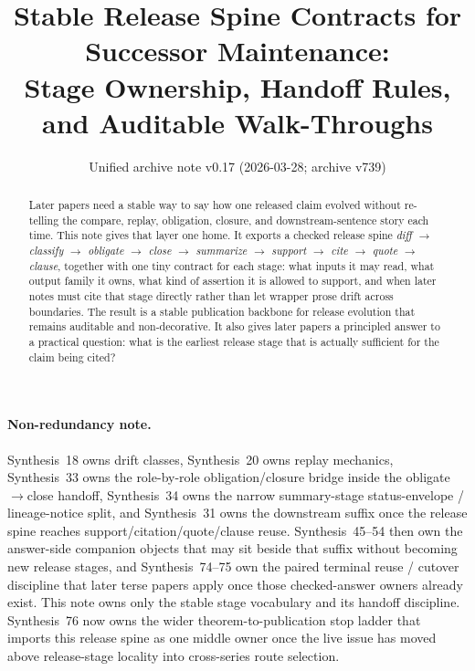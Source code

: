 \documentclass[11pt]{article}
\title{Stable Release Spine Contracts for Successor Maintenance:\\[0.5ex]
\large Stage Ownership, Handoff Rules, and Auditable Walk-Throughs}
\author{}
\date{Unified archive note v0.17 (2026-03-28; archive v739)}
\begin{document}
\maketitle

\begin{abstract}
Later papers need a stable way to say how one released claim evolved without re-telling the compare, replay, obligation, closure, and downstream-sentence story each time.
This note gives that layer one home.
It exports a checked release spine
\emph{diff $\to$ classify $\to$ obligate $\to$ close $\to$ summarize $\to$ support $\to$ cite $\to$ quote $\to$ clause},
together with one tiny contract for each stage: what inputs it may read, what output family it owns, what kind of assertion it is allowed to support, and when later notes must cite that stage directly rather than let wrapper prose drift across boundaries.
The result is a stable publication backbone for release evolution that remains auditable and non-decorative.
It also gives later papers a principled answer to a practical question: what is the earliest release stage that is actually sufficient for the claim being cited?
\end{abstract}

\paragraph{Non-redundancy note.}
Synthesis~18 owns drift classes, Synthesis~20 owns replay mechanics, Synthesis~33 owns the role-by-role obligation/closure bridge inside the obligate$\to$close handoff, Synthesis~34 owns the narrow summary-stage status-envelope / lineage-notice split, and Synthesis~31 owns the downstream suffix once the release spine reaches support/citation/quote/clause reuse. Synthesis~45--54 then own the answer-side companion objects that may sit beside that suffix without becoming new release stages, and Synthesis~74--75 own the paired terminal reuse / cutover discipline that later terse papers apply once those checked-answer owners already exist.\cite{series:challengeanswercapsules,series:challengeanswersheets,series:challengeanswercards,series:challengeanswercarrierslots,series:challengeansweraudittrails,series:challengeanswercitationdockets,series:challengeanswerpublicationprofiles,series:challengeanswerdisclosurepackets,series:challengeanswerescalationladders,series:challengeanswerreviewmenus,series:pairedterminalcitationdiscipline,series:pairedterminalcutoverrules}
This note owns only the stable stage vocabulary and its handoff discipline. Synthesis~76 now owns the wider theorem-to-publication stop ladder that imports this release spine as one middle owner once the live issue has moved above release-stage locality into cross-series route selection.\cite{series:theoremtopublicationspine}
\end{document}

